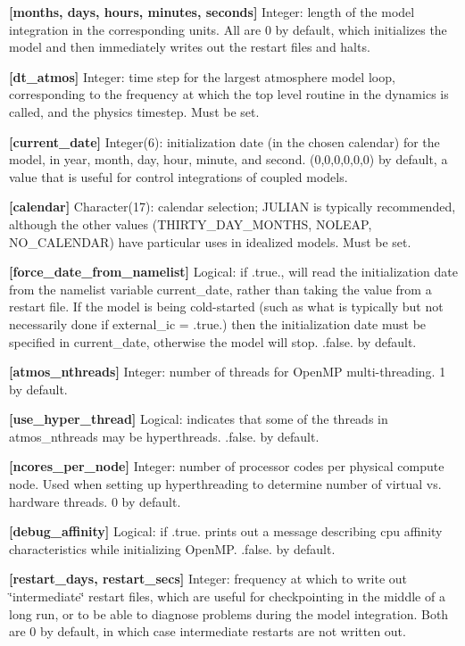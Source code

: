 {\bfseries \mbox{[}months, days, hours, minutes, seconds\mbox{]}} Integer\+: length of the model integration in the corresponding units. All are 0 by default, which initializes the model and then immediately writes out the restart files and halts.

{\bfseries \mbox{[}dt\+\_\+atmos\mbox{]}} Integer\+: time step for the largest atmosphere model loop, corresponding to the frequency at which the top level routine in the dynamics is called, and the physics timestep. Must be set.

{\bfseries \mbox{[}current\+\_\+date\mbox{]}} Integer(6)\+: initialization date (in the chosen calendar) for the model, in year, month, day, hour, minute, and second. (0,0,0,0,0,0) by default, a value that is useful for control integrations of coupled models.

{\bfseries \mbox{[}calendar\mbox{]}} Character(17)\+: calendar selection; J\+U\+L\+I\+AN is typically recommended, although the other values (T\+H\+I\+R\+T\+Y\+\_\+\+D\+A\+Y\+\_\+\+M\+O\+N\+T\+HS, N\+O\+L\+E\+AP, N\+O\+\_\+\+C\+A\+L\+E\+N\+D\+AR) have particular uses in idealized models. Must be set.

{\bfseries \mbox{[}force\+\_\+date\+\_\+from\+\_\+namelist\mbox{]}} Logical\+: if .true., will read the initialization date from the namelist variable current\+\_\+date, rather than taking the value from a restart file. If the model is being cold-\/started (such as what is typically but not necessarily done if external\+\_\+ic = .true.) then the initialization date must be specified in current\+\_\+date, otherwise the model will stop. .false. by default.

{\bfseries \mbox{[}atmos\+\_\+nthreads\mbox{]}} Integer\+: number of threads for Open\+MP multi-\/threading. 1 by default.

{\bfseries \mbox{[}use\+\_\+hyper\+\_\+thread\mbox{]}} Logical\+: indicates that some of the threads in atmos\+\_\+nthreads may be hyperthreads. .false. by default.

{\bfseries \mbox{[}ncores\+\_\+per\+\_\+node\mbox{]}} Integer\+: number of processor codes per physical compute node. Used when setting up hyperthreading to determine number of virtual vs. hardware threads. 0 by default.

{\bfseries \mbox{[}debug\+\_\+affinity\mbox{]}} Logical\+: if .true. prints out a message describing cpu affinity characteristics while initializing Open\+MP. .false. by default.

{\bfseries \mbox{[}restart\+\_\+days, restart\+\_\+secs\mbox{]}} Integer\+: frequency at which to write out \char`\"{}intermediate\char`\"{} restart files, which are useful for checkpointing in the middle of a long run, or to be able to diagnose problems during the model integration. Both are 0 by default, in which case intermediate restarts are not written out.

